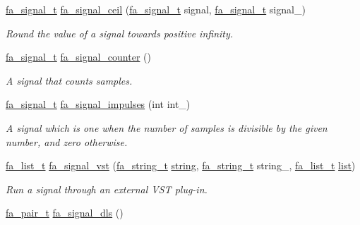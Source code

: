 \begin{DoxyCompactItemize}
\hyperlink{group___fa_signal_gac5c72f160cd6e93a6783551627b166e5}{fa\-\_\-signal\-\_\-t} \hyperlink{group___fa_signal_ga43d1c296dd9d2e3f40a386ade7dd9f8c}{fa\-\_\-signal\-\_\-ceil} (\hyperlink{group___fa_signal_gac5c72f160cd6e93a6783551627b166e5}{fa\-\_\-signal\-\_\-t} signal, \hyperlink{group___fa_signal_gac5c72f160cd6e93a6783551627b166e5}{fa\-\_\-signal\-\_\-t} signal\-\_\-)
\begin{DoxyCompactList}\small\item\em Round the value of a signal towards positive infinity. \end{DoxyCompactList}\item 
\hyperlink{group___fa_signal_gac5c72f160cd6e93a6783551627b166e5}{fa\-\_\-signal\-\_\-t} \hyperlink{group___fa_signal_ga74c06ebdff78058787c4085913942378}{fa\-\_\-signal\-\_\-counter} ()
\begin{DoxyCompactList}\small\item\em A signal that counts samples. \end{DoxyCompactList}\item 
\hyperlink{group___fa_signal_gac5c72f160cd6e93a6783551627b166e5}{fa\-\_\-signal\-\_\-t} \hyperlink{group___fa_signal_ga79be8fdec3cdf8013002f5535042a7ad}{fa\-\_\-signal\-\_\-impulses} (int int\-\_\-)
\begin{DoxyCompactList}\small\item\em A signal which is one when the number of samples is divisible by the given number, and zero otherwise. \end{DoxyCompactList}\item 
\hyperlink{group___fa_list_ga35ecb12ab934ded0cce0bcf28e3bc5d2}{fa\-\_\-list\-\_\-t} \hyperlink{group___fa_signal_gaf269844fac726551561ebde40c9c78fb}{fa\-\_\-signal\-\_\-vst} (\hyperlink{group___fa_string_gacada63033b77bc6c39fa632ae199349b}{fa\-\_\-string\-\_\-t} \hyperlink{util_8h_a41106000aac73b61e4fc2ef9dd39a603}{string}, \hyperlink{group___fa_string_gacada63033b77bc6c39fa632ae199349b}{fa\-\_\-string\-\_\-t} string\-\_\-, \hyperlink{group___fa_list_ga35ecb12ab934ded0cce0bcf28e3bc5d2}{fa\-\_\-list\-\_\-t} \hyperlink{literals_8h_a4ddd63dfcfec2b4d5741a56aa6003c76}{list})
\begin{DoxyCompactList}\small\item\em Run a signal through an external V\-S\-T plug-\/in. \end{DoxyCompactList}\item 
\hyperlink{group___fa_pair_gac2b2e58c230bac4f8a63ef6c05072680}{fa\-\_\-pair\-\_\-t} \hyperlink{group___fa_signal_ga357d3bef78de7c85b1840494a05ee8f5}{fa\-\_\-signal\-\_\-dls} ()

\end{DoxyCompactItemize}

